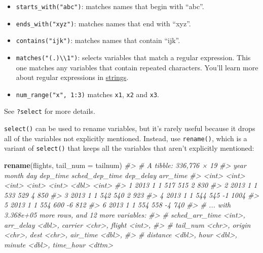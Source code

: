 \documentclass[]{book}
\newenvironment{Shaded}{\begin{snugshade}}{\end{snugshade}}
\newcommand{\KeywordTok}[1]{\textcolor[rgb]{0.13,0.29,0.53}{\textbf{{#1}}}}
\newcommand{\DataTypeTok}[1]{\textcolor[rgb]{0.13,0.29,0.53}{{#1}}}
\newcommand{\CommentTok}[1]{\textcolor[rgb]{0.56,0.35,0.01}{\textit{{#1}}}}
\newcommand{\NormalTok}[1]{{#1}}
\begin{document}
\begin{itemize}
\item
  \texttt{starts\_with("abc")}: matches names that begin with ``abc''.
\item
  \texttt{ends\_with("xyz")}: matches names that end with ``xyz''.
\item
  \texttt{contains("ijk")}: matches names that contain ``ijk''.
\item
  \texttt{matches("(.)\textbackslash{}\textbackslash{}1")}: selects
  variables that match a regular expression. This one matches any
  variables that contain repeated characters. You'll learn more about
  regular expressions in \protect\hyperlink{strings}{strings}.
\item
  \texttt{num\_range("x",\ 1:3)} matches \texttt{x1}, \texttt{x2} and
  \texttt{x3}.
\end{itemize}

See \texttt{?select} for more details.

\texttt{select()} can be used to rename variables, but it's rarely
useful because it drops all of the variables not explicitly mentioned.
Instead, use \texttt{rename()}, which is a variant of \texttt{select()}
that keeps all the variables that aren't explicitly mentioned:

\begin{Shaded}
\begin{Highlighting}[]
\KeywordTok{rename}\NormalTok{(flights, }\DataTypeTok{tail_num =} \NormalTok{tailnum)}
\CommentTok{#> # A tibble: 336,776 × 19}
\CommentTok{#>    year month   day dep_time sched_dep_time dep_delay arr_time}
\CommentTok{#>   <int> <int> <int>    <int>          <int>     <dbl>    <int>}
\CommentTok{#> 1  2013     1     1      517            515         2      830}
\CommentTok{#> 2  2013     1     1      533            529         4      850}
\CommentTok{#> 3  2013     1     1      542            540         2      923}
\CommentTok{#> 4  2013     1     1      544            545        -1     1004}
\CommentTok{#> 5  2013     1     1      554            600        -6      812}
\CommentTok{#> 6  2013     1     1      554            558        -4      740}
\CommentTok{#> # ... with 3.368e+05 more rows, and 12 more variables:}
\CommentTok{#> #   sched_arr_time <int>, arr_delay <dbl>, carrier <chr>, flight <int>,}
\CommentTok{#> #   tail_num <chr>, origin <chr>, dest <chr>, air_time <dbl>,}
\CommentTok{#> #   distance <dbl>, hour <dbl>, minute <dbl>, time_hour <dttm>}
\end{Highlighting}
\end{Shaded}
\end{document}
